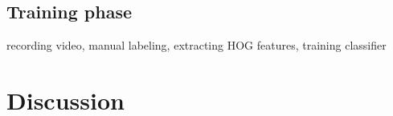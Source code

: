 \subsection*{Training phase}
recording video, manual labeling, extracting HOG features, training classifier

\section{Discussion}
